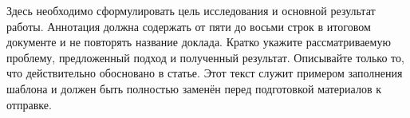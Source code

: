 Здесь необходимо сформулировать цель исследования и основной результат работы.
Аннотация должна содержать от пяти до восьми строк в итоговом документе и не
повторять название доклада. Кратко укажите рассматриваемую проблему, предложенный
подход и полученный результат. Описывайте только то, что действительно обосновано
в статье. Этот текст служит примером заполнения шаблона и должен быть полностью
заменён перед подготовкой материалов к отправке.
